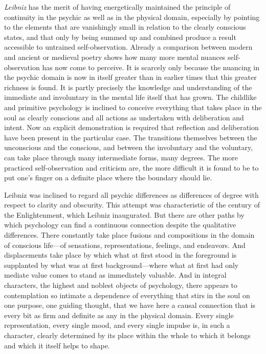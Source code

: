 \documentclass[12pt,a4paper]{book}
\newcommand{\opage}[1]{\marginnote{\footnotesize\textit{[#1]}}}
\begin{document}
\emph{Leibniz} has the merit of having energetically maintained the
principle of continuity in the psychic as well as in the physical
domain, especially by pointing to the elements that are vanishingly
small in relation to the clearly conscious states, and that only by
being summed up and combined produce a result accessible to untrained
self-observation. Already a comparison between modern and ancient or
\opage{29}medieval poetry shows how many more mental nuances self-observation has
now come to perceive. It is scarcely only because the nuancing in the
psychic domain is now in itself greater than in earlier times that this
greater richness is found. It is partly precisely the knowledge and
understanding of the immediate and involuntary in the mental life itself
that has grown. The childlike and primitive psychology is inclined to
conceive everything that takes place in the soul as clearly conscious
and all actions as undertaken with deliberation and intent. Now an
explicit demonstration is required that reflection and deliberation have
been present in the particular case. The transitions themselves between
the unconscious and the conscious, and between the involuntary and the
voluntary, can take place through many intermediate forms, many degrees.
The more practiced self-observation and criticism are, the more
difficult it is found to be to put one's finger on a definite place
where the boundary should lie.

Leibniz was inclined to regard all psychic differences as differences of
degree with respect to clarity and obscurity. This attempt was
characteristic of the century of the Enlightenment, which Leibniz
inaugurated. But there are other paths by which psychology can find a
continuous connection despite the qualitative differences. There
constantly take place fusions and compositions in the domain of
conscious life---of sensations, representations, feelings, and
endeavors. And displacements take place by which what at first stood in
the foreground is supplanted by what was at first background---where what
at first had only mediate value comes to stand as immediately valuable.
And in integral characters, the highest and noblest objects of
psychology, there appears to contemplation so intimate a dependence of
everything that stirs in the soul on one purpose, one guiding thought,
that we have here a causal connection that is every bit as firm and
definite as any in the physical domain. Every single representation,
every single mood, and every single impulse is, in such a character,
clearly determined by its place \opage{30}within the whole to which it belongs and
which it itself helps to shape.
\end{document}
